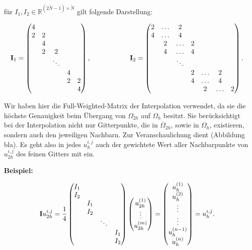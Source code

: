 für $I_{1},I_{2} \in \mathbb{R}^{(2\tilde N - 1) \times \tilde N}$ gilt folgende Darstellung:

\begin{equation}
{\textbf{I}}_{1} =
\begin{pmatrix}
4 & & & &\\
2 & 2 & & &\\
& 4 & & &\\
& 2 & 2 & &\\
& & \ddots & &\\
& & & 4 &\\
& & & 2 & 2\\
& & & & 4\\
\end{pmatrix},
\hspace{2cm}
{\textbf{I}}_{2} =
\begin{pmatrix}
2 & \hdots & 2 & & & &\\
4 & \hdots & 4 & & & &\\
& 2 & \hdots & 2 & & &\\
& 4 & \hdots & 4 & & &\\
& & \ddots & & & &\\
& & & 2 & \hdots & 2 &\\
& & & 4 & \hdots & 4 &\\
& & & & 2 & \hdots & 2\\
\end{pmatrix}.
\end{equation}

Wir haben hier die Full-Weighted-Matrix der Interpolation verwendet, da sie die höchste Genauigkeit beim Übergang von $\Omega_{2h}$ auf $\Omega_{h}$ besitzt. Sie berücksichtigt bei der Interpolation nicht nur Gitterpunkte, die in $\Omega_{2h}$, sowie in $\Omega_{h}$, existieren, sondern auch den jeweiligen Nachbarn. Zur Veranschaulichung dient (Abbildung bla). Es geht also in jedes $u^{i,j}_{h}$ auch der gewichtete Wert aller Nachbarpunkte von $u^{i,j}_{2h}$ des feinen Gitters mit ein.

\textbf{Beispiel:}

\begin{equation}
{\textbf{I}}u^{i,j}_{2h} = \frac {1} {4}
\begin{pmatrix}
I_{1} & & &\\
I_{2} & & &\\
& I_{1} & &\\
& I_{2} & &\\
& & \ddots &\\
& & & I_{1}\\
& & & I_{2}
\end{pmatrix}
\begin{pmatrix}
u_{2h}^{(1)} \\
\vdots \\
u_{2h}^{(m)}
\end{pmatrix} =
\begin{pmatrix}
u_{h}^{(1)} \\
u_{h}^{(2)} \\
\vdots \\
\vdots \\
u_{h}^{(n-1)}\\
u_{h}^{(n)}
\end{pmatrix} =
u^{i,j}_{h}.
\end{equation}

